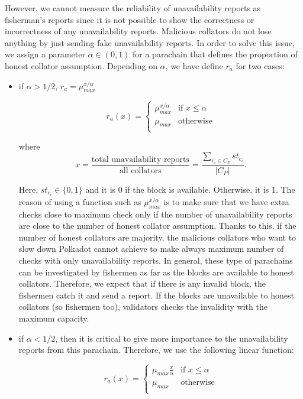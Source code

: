 However, we cannot measure the reliability of unavailability reports as fisherman's reports since it is not possible to show the correctness or incorrectness of any unavailability reports. Malicious collators do not lose anything by just sending fake unavailability reports. In order to solve this issue, we assign a parameter $\alpha \in (0,1)$ for a parachain that defines the proportion of honest collator assumption. Depending on $\alpha$, we have define $r_a$ for two cases:
\begin{itemize}
    \item if $\alpha > 1/2$, $r_a = \mu_{max}^{x/\alpha}$ 
    
        \[   
    r_a(x)= 
     \begin{cases}
       \mu_{max}^{x/\alpha} & \text{if } x \leq \alpha \\
       \mu_{max} &\text{otherwise} \\ 
     \end{cases}
\]  
    
    where 
    $$x = \frac{\text{total unavailability reports}}{\text{all collators}} = \frac{\sum_{c_i \in C_P}st_{c_i}}{|C_P|}.$$
    
    Here, $st_{c_i}\in \{0,1\}$ and it is 0 if the block is available. Otherwise, it is 1. The reason of using a function such as $\mu_{max}^{x/\alpha}$ is to make sure that we have extra checks close to maximum check only if the number of unavailability reports are close to the number of honest collator assumption. Thanks to this, if the number of honest collators are majority, the malicious collators who want to slow down Polkadot cannot achieve to make always maximum number of checks with only unavailability reports. In general, these type of parachains can be investigated by fishermen as far as the blocks are available to honest collators. Therefore, we expect that if there is any invalid block, the fishermen catch it and send a report. If the blocks are unavailable to honest collators (so fishermen too), validators checks the invalidity with the maximum capacity.  
    
    \item if $\alpha < 1/2$, then it is critical to give more importance to the unavailability reports from this parachain. Therefore, we use the following linear function:
    
    \[   
    r_a(x)= 
     \begin{cases}
       \mu_{max}\frac{x}{\alpha} & \text{if } x \leq \alpha \\
       \mu_{max} &\text{otherwise} \\ 
     \end{cases}
\]  
\end{itemize}


